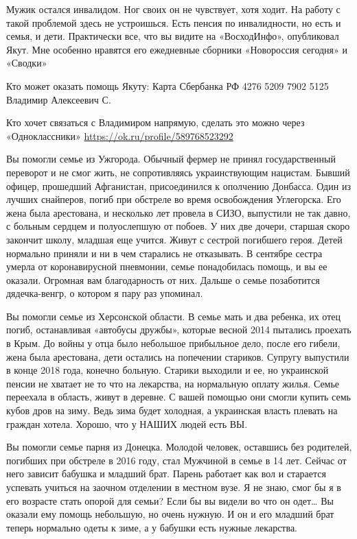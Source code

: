 Мужик остался инвалидом. Ног своих он не чувствует, хотя ходит. На работу с
такой проблемой здесь не устроишься. Есть пенсия по инвалидности, но есть и
семья, и дети. Практически все, что вы видите на «ВосходИнфо», опубликовал
Якут. Мне особенно нравятся его ежедневные сборники «Новороссия сегодня» и
«Сводки»

Кто может оказать помощь Якуту: Карта Сбербанка РФ 4276 5209 7902 5125 Владимир
Алексеевич С.

Кто хочет связаться с Владимиром напрямую, сделать это можно через
«Одноклассники» \url{https://ok.ru/profile/589768523292}

Вы помогли семье из Ужгорода. Обычный фермер не принял государственный
переворот и не смог жить, не сопротивляясь украинствующим нацистам. Бывший
офицер, прошедший Афганистан, присоединился к ополчению Донбасса. Один из
лучших снайперов, погиб при обстреле во время освобождения Углегорска. Его жена
была арестована, и несколько лет провела в СИЗО, выпустили не так давно, с
больным сердцем и полуослепшую от побоев. У них две дочери, старшая скоро
закончит школу, младшая еще учится. Живут с сестрой погибшего героя. Детей
нормально приняли и ни в чем старались не отказывать. В сентябре сестра умерла
от коронавирусной пневмонии, семье понадобилась помощь, и вы ее оказали.
Огромная вам благодарность от них. Дальше о семье позаботится дядечка-венгр, о
котором я пару раз упоминал.

Вы помогли семье из Херсонской области. В семье мать и два ребенка, их отец
погиб, останавливая «автобусы дружбы», которые весной 2014 пытались проехать в
Крым. До войны у отца было небольшое прибыльное дело, после его гибели, жена
была арестована, дети остались на попечении стариков. Супругу выпустили в конце
2018 года, конечно больную. Старики выходили и ее, но украинской пенсии не
хватает не то что на лекарства, на нормальную оплату жилья. Семье переехала в
область, живут в деревне. С вашей помощью они смогли купить семь кубов дров на
зиму. Ведь зима будет холодная, а украинская власть плевать на граждан хотела.
Хорошо, что у НАШИХ людей есть ВЫ.

Вы помогли семье парня из Донецка. Молодой человек, оставшись без родителей,
погибших при обстреле в 2016 году, стал Мужчиной в семье в 14 лет. Сейчас от
него зависит бабушка и младший брат. Парень работает как вол и старается
успевать учиться на заочном отделении в местном вузе. Я не знаю, смог бы я в
его возрасте стать опорой для семьи? Если бы вы видели во что он одет… Вы
оказали ему помощь небольшую, но очень нужную. И он и его младший брат теперь
нормально одеты к зиме, а у бабушки есть нужные лекарства.

